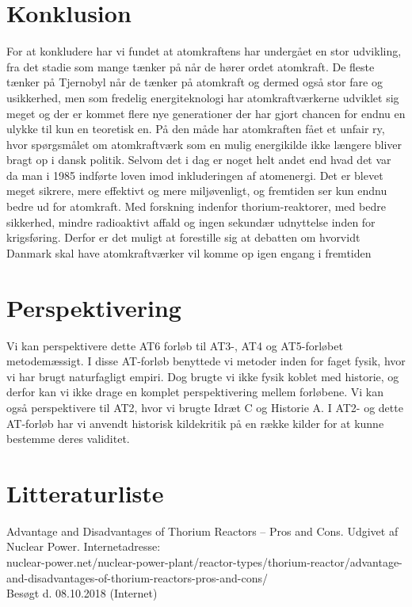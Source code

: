\documentclass{article}
\begin{document}
\section{Konklusion}

For at konkludere har vi fundet at atomkraftens har undergået en stor udvikling, fra det stadie som mange tænker på når de hører ordet atomkraft. De fleste tænker på Tjernobyl når de tænker på atomkraft og dermed også stor fare og usikkerhed, men  som fredelig energiteknologi har atomkraftværkerne udviklet sig meget og der er kommet flere nye generationer der har gjort chancen for endnu en ulykke til kun en teoretisk en. På den måde har atomkraften fået et unfair ry, hvor spørgsmålet om atomkraftværk som en mulig energikilde ikke længere bliver bragt op i dansk politik. Selvom det i dag er noget helt andet end hvad det var da man i 1985 indførte loven imod inkluderingen af atomenergi. Det er blevet meget sikrere, mere effektivt og mere miljøvenligt, og fremtiden ser kun endnu bedre ud for atomkraft. Med forskning indenfor thorium-reaktorer, med bedre sikkerhed, mindre radioaktivt affald og ingen sekundær udnyttelse inden for krigsføring. Derfor er det muligt at forestille sig at debatten om hvorvidt Danmark skal have atomkraftværker vil komme op igen engang i fremtiden

\section{Perspektivering}

Vi kan perspektivere dette AT6 forløb til AT3-, AT4 og AT5-forløbet metodemæssigt.
I disse AT-forløb benyttede vi metoder inden for faget fysik,
hvor vi har brugt naturfagligt empiri.
Dog brugte vi ikke fysik koblet med historie, og derfor kan vi
ikke drage en komplet perspektivering mellem forløbene.
Vi kan også perspektivere til AT2, hvor vi brugte Idræt C og Historie A. I AT2- 
og dette AT-forløb har vi anvendt historisk kildekritik på
en række kilder for at kunne bestemme deres validitet.

\section{Litteraturliste}
\small

Advantage and Disadvantages of Thorium Reactors – Pros and Cons. Udgivet af Nuclear Power. Internetadresse:\\
nuclear-power.net/nuclear-power-plant/reactor-types/thorium-reactor/advantage-and-disadvantages-of-thorium-reactors-pros-and-cons/\\
Besøgt d. 08.10.2018 (Internet)\\
\end{document}
